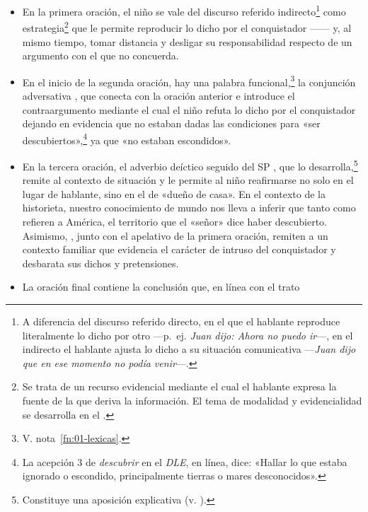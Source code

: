 \begin{itemize}
  \item En la primera oración, el niño se vale del discurso referido
        indirecto\footnote{A diferencia del discurso referido directo, en el
        que el hablante reproduce literalmente lo dicho por otro ---p.~ej.
        \textit{Juan dijo: Ahora no puedo ir}---, en el indirecto el hablante
        ajusta lo dicho a su situación comunicativa ---\textit{Juan dijo que en
        ese momento no podía venir}---.} como estrategia\footnote{Se trata de un
        recurso evidencial mediante el cual el hablante expresa la fuente de la
        que deriva la información. El tema de modalidad y evidencialidad se
        desarrolla en el .} que le permite reproducir lo dicho por el
        conquistador ------ y, al
        mismo tiempo, tomar distancia y desligar su responsabilidad respecto de
        un argumento con el que no concuerda.
  \item En el inicio de la segunda oración, hay una palabra
        funcional,\footnote{V. nota~\ref{fn:01-lexicas}.} la conjunción
        adversativa , que conecta con la oración anterior e
        introduce el contraargumento mediante el cual el niño refuta lo dicho
        por el conquistador dejando en evidencia que no estaban dadas las
        condiciones para «ser descubiertos»,\footnote{La acepción 3 de
        \textit{descubrir} en el \textit{DLE}, en línea, dice: «Hallar lo que
        estaba ignorado o escondido, principalmente tierras o mares
        desconocidos».} ya que «no estaban escondidos».
  \item En la tercera oración, el adverbio deíctico  seguido del SP
        , que lo desarrolla,\footnote{Constituye una aposición
        explicativa (v. ).} remite al contexto de situación y le
        permite al niño reafirmarse no solo en el lugar de hablante, sino en el
        de «dueño de casa». En el contexto de la historieta, nuestro
        conocimiento de mundo nos lleva a inferir que tanto  como
         refieren a América, el territorio que el «señor» dice
        haber descubierto. Asimismo, , junto con el apelativo
         de la primera oración, remiten a un contexto familiar que
        evidencia el carácter de intruso del conquistador y desbarata sus
        dichos y pretensiones.
  \item La oración final contiene la conclusión que, en línea con el trato

\end{itemize}
